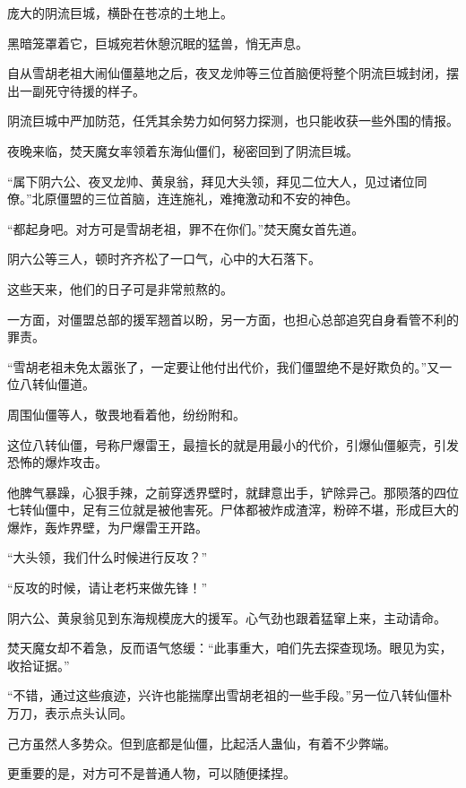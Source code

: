 
\begin{this_body}

庞大的阴流巨城，横卧在苍凉的土地上。

黑暗笼罩着它，巨城宛若休憩沉眠的猛兽，悄无声息。

自从雪胡老祖大闹仙僵墓地之后，夜叉龙帅等三位首脑便将整个阴流巨城封闭，摆出一副死守待援的样子。

阴流巨城中严加防范，任凭其余势力如何努力探测，也只能收获一些外围的情报。

夜晚来临，焚天魔女率领着东海仙僵们，秘密回到了阴流巨城。

“属下阴六公、夜叉龙帅、黄泉翁，拜见大头领，拜见二位大人，见过诸位同僚。”北原僵盟的三位首脑，连连施礼，难掩激动和不安的神色。

“都起身吧。对方可是雪胡老祖，罪不在你们。”焚天魔女首先道。

阴六公等三人，顿时齐齐松了一口气，心中的大石落下。

这些天来，他们的日子可是非常煎熬的。

一方面，对僵盟总部的援军翘首以盼，另一方面，也担心总部追究自身看管不利的罪责。

“雪胡老祖未免太嚣张了，一定要让他付出代价，我们僵盟绝不是好欺负的。”又一位八转仙僵道。

周围仙僵等人，敬畏地看着他，纷纷附和。

这位八转仙僵，号称尸爆雷王，最擅长的就是用最小的代价，引爆仙僵躯壳，引发恐怖的爆炸攻击。

他脾气暴躁，心狠手辣，之前穿透界壁时，就肆意出手，铲除异己。那陨落的四位七转仙僵中，足有三位就是被他害死。尸体都被炸成渣滓，粉碎不堪，形成巨大的爆炸，轰炸界壁，为尸爆雷王开路。

“大头领，我们什么时候进行反攻？”

“反攻的时候，请让老朽来做先锋！”

阴六公、黄泉翁见到东海规模庞大的援军。心气劲也跟着猛窜上来，主动请命。

焚天魔女却不着急，反而语气悠缓：“此事重大，咱们先去探查现场。眼见为实，收拾证据。”

“不错，通过这些痕迹，兴许也能揣摩出雪胡老祖的一些手段。”另一位八转仙僵朴万刀，表示点头认同。

己方虽然人多势众。但到底都是仙僵，比起活人蛊仙，有着不少弊端。

更重要的是，对方可不是普通人物，可以随便揉捏。


\end{this_body}
